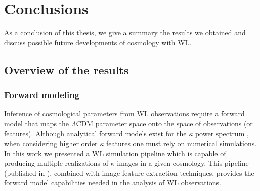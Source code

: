 
\chapter{Conclusions}
 \thispagestyle{plain}
\setlength{\parindent}{10mm}
\label{chp:8}


As a conclusion of this thesis, we give a summary the results we obtained and discuss possible future developments of cosmology with WL. 

\section{Overview of the results}

\subsection{Forward modeling}
Inference of cosmological parameters from WL observations require a forward model that maps the $\Lambda$CDM parameter space onto the space of observations (or features). Although analytical forward models exist for the $\kappa$ power spectrum \citep{Nicaea,Nicaea17,Coyote2}, when considering higher order $\kappa$ features one must rely on numerical simulations. In this work we presented a WL simulation pipeline which is capable of producing multiple realizations of $\kappa$ images in a given cosmology. This pipeline (published in \citep{lenstools}), combined with image feature extraction techniques, provides the forward model capabilities needed in the analysis of WL observations. 

